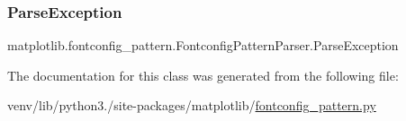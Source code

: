 \subsubsection{\texorpdfstring{Parse\+Exception}{ParseException}}
{\footnotesize\ttfamily matplotlib.\+fontconfig\+\_\+pattern.\+Fontconfig\+Pattern\+Parser.\+Parse\+Exception}



The documentation for this class was generated from the following file\+:\begin{DoxyCompactItemize}
\item 
venv/lib/python3./site-\/packages/matplotlib/\hyperlink{fontconfig__pattern_8py}{fontconfig\+\_\+pattern.\+py}\end{DoxyCompactItemize}
